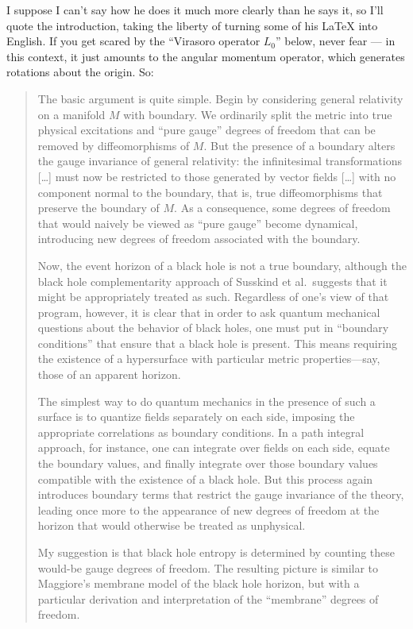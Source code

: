 \documentclass[12pt]{article}
\begin{document}
I suppose I can't say how he does it much more clearly than he says it,
so I'll quote the introduction, taking the liberty of turning some of
his LaTeX into English. If you get scared by the ``Virasoro operator
\(L_0\)'' below, never fear --- in this context, it just amounts to the
angular momentum operator, which generates rotations about the origin.
So:

\begin{quote}
The basic argument is quite simple. Begin by considering general
relativity on a manifold \(M\) with boundary. We ordinarily split the
metric into true physical excitations and ``pure gauge'' degrees of
freedom that can be removed by diffeomorphisms of \(M\). But the
presence of a boundary alters the gauge invariance of general
relativity: the infinitesimal transformations {[}\ldots{]} must now be
restricted to those generated by vector fields {[}\ldots{]} with no
component normal to the boundary, that is, true diffeomorphisms that
preserve the boundary of \(M\). As a consequence, some degrees of
freedom that would naively be viewed as ``pure gauge'' become dynamical,
introducing new degrees of freedom associated with the boundary.

Now, the event horizon of a black hole is not a true boundary, although
the black hole complementarity approach of Susskind et al.~suggests that
it might be appropriately treated as such. Regardless of one's view of
that program, however, it is clear that in order to ask quantum
mechanical questions about the behavior of black holes, one must put in
``boundary conditions'' that ensure that a black hole is present. This
means requiring the existence of a hypersurface with particular metric
properties---say, those of an apparent horizon.

The simplest way to do quantum mechanics in the presence of such a
surface is to quantize fields separately on each side, imposing the
appropriate correlations as boundary conditions. In a path integral
approach, for instance, one can integrate over fields on each side,
equate the boundary values, and finally integrate over those boundary
values compatible with the existence of a black hole. But this process
again introduces boundary terms that restrict the gauge invariance of
the theory, leading once more to the appearance of new degrees of
freedom at the horizon that would otherwise be treated as unphysical.

My suggestion is that black hole entropy is determined by counting these
would-be gauge degrees of freedom. The resulting picture is similar to
Maggiore's membrane model of the black hole horizon, but with a
particular derivation and interpretation of the ``membrane'' degrees of
freedom.


\end{quote}
\end{document}
